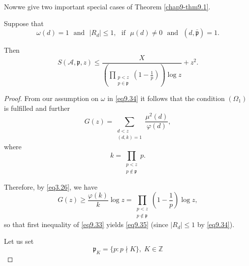 Now\pageoriginale we give two important special cases of Theorem
\ref{chap9-thm9.1}. 

\begin{theorem}\label{chap9-thm9.2}%
Suppose that 
\begin{equation*}
\omega(d) = 1 \text{~ and~ } |R_d| \leq 1, \text{~ if~ } \mu (d) \neq 0
\text{~ and~ } ( d, \bar{\mathfrak{p}} ) = 1.\tag{9.34}\label{eq9.34} 
\end{equation*}

Then
\begin{equation*}
S(\mathscr{A},\mathfrak{p},z) \leq \frac{X}{(\prod
  \limits_{\substack{p< z \\ {p \in \mathfrak{p}}}}(1-\frac{1}{p}))
  \log z}+ z^2.\tag{9.35}\label{eq9.35} 
\end{equation*}
\end{theorem}

\begin{proof}%
From our assumption on $\omega$ in \eqref{eq9.34} it follows that the
condition $(\Omega_1)$ is fulfilled and further  
\begin{equation*}
G(z) = \sum_{\substack{d< z \\ {(d,k) =1}}} \frac{\mu^2
  (d)}{\varphi(d)},\tag{9.36}\label{eq9.36} 
\end{equation*}
where
\begin{equation*}
k = \prod \limits_{\substack{p< z \\ {p \notin \mathfrak{p}}}}
p.\tag{9.37}\label{eq9.37} 
\end{equation*}

Therefore, by \eqref{eq3.26}, we have 
\begin{equation*}
G(z) \geq \frac{\varphi(k)}{k} \log z = \prod\limits_{\substack{p< z
    \\ {p \notin \mathfrak{p}}}}(1- \frac{1}{p}) \log
z,\tag{9.38}\label{eq9.38}  
\end{equation*}
so that first inequality of \eqref{eq9.33} yields \eqref{eq9.35}
(since $|R_d| \leq 1$ by \eqref{eq9.34}). 

Let us set 
\begin{equation*}
\mathfrak{p}_K= \{ p : p \nmid K \}, \; K \in
\mathbb{Z}\tag{9.39}\label{eq9.39} 
\end{equation*}
\end{proof}

